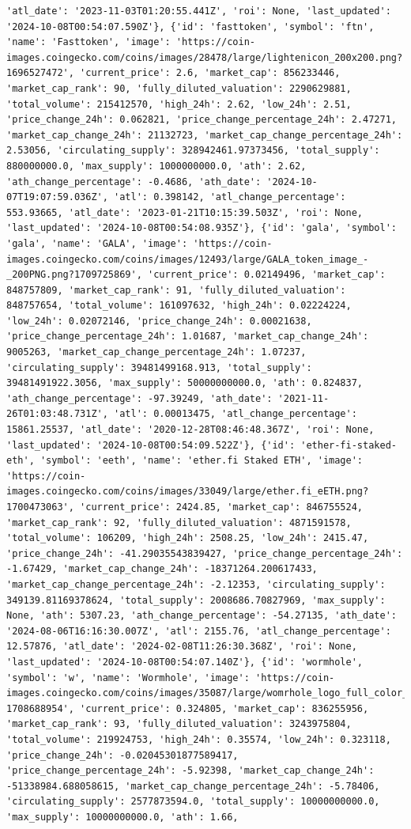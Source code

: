 \documentclass[
  letterpaper,
  DIV=11,
  numbers=noendperiod]{scrreprt}
\begin{document}
\begin{verbatim}
'atl_date': '2023-11-03T01:20:55.441Z', 'roi': None, 'last_updated': '2024-10-08T00:54:07.590Z'}, {'id': 'fasttoken', 'symbol': 'ftn', 'name': 'Fasttoken', 'image': 'https://coin-images.coingecko.com/coins/images/28478/large/lightenicon_200x200.png?1696527472', 'current_price': 2.6, 'market_cap': 856233446, 'market_cap_rank': 90, 'fully_diluted_valuation': 2290629881, 'total_volume': 215412570, 'high_24h': 2.62, 'low_24h': 2.51, 'price_change_24h': 0.062821, 'price_change_percentage_24h': 2.47271, 'market_cap_change_24h': 21132723, 'market_cap_change_percentage_24h': 2.53056, 'circulating_supply': 328942461.97373456, 'total_supply': 880000000.0, 'max_supply': 1000000000.0, 'ath': 2.62, 'ath_change_percentage': -0.4686, 'ath_date': '2024-10-07T19:07:59.036Z', 'atl': 0.398142, 'atl_change_percentage': 553.93665, 'atl_date': '2023-01-21T10:15:39.503Z', 'roi': None, 'last_updated': '2024-10-08T00:54:08.935Z'}, {'id': 'gala', 'symbol': 'gala', 'name': 'GALA', 'image': 'https://coin-images.coingecko.com/coins/images/12493/large/GALA_token_image_-_200PNG.png?1709725869', 'current_price': 0.02149496, 'market_cap': 848757809, 'market_cap_rank': 91, 'fully_diluted_valuation': 848757654, 'total_volume': 161097632, 'high_24h': 0.02224224, 'low_24h': 0.02072146, 'price_change_24h': 0.00021638, 'price_change_percentage_24h': 1.01687, 'market_cap_change_24h': 9005263, 'market_cap_change_percentage_24h': 1.07237, 'circulating_supply': 39481499168.913, 'total_supply': 39481491922.3056, 'max_supply': 50000000000.0, 'ath': 0.824837, 'ath_change_percentage': -97.39249, 'ath_date': '2021-11-26T01:03:48.731Z', 'atl': 0.00013475, 'atl_change_percentage': 15861.25537, 'atl_date': '2020-12-28T08:46:48.367Z', 'roi': None, 'last_updated': '2024-10-08T00:54:09.522Z'}, {'id': 'ether-fi-staked-eth', 'symbol': 'eeth', 'name': 'ether.fi Staked ETH', 'image': 'https://coin-images.coingecko.com/coins/images/33049/large/ether.fi_eETH.png?1700473063', 'current_price': 2424.85, 'market_cap': 846755524, 'market_cap_rank': 92, 'fully_diluted_valuation': 4871591578, 'total_volume': 106209, 'high_24h': 2508.25, 'low_24h': 2415.47, 'price_change_24h': -41.29035543839427, 'price_change_percentage_24h': -1.67429, 'market_cap_change_24h': -18371264.200617433, 'market_cap_change_percentage_24h': -2.12353, 'circulating_supply': 349139.81169378624, 'total_supply': 2008686.70827969, 'max_supply': None, 'ath': 5307.23, 'ath_change_percentage': -54.27135, 'ath_date': '2024-08-06T16:16:30.007Z', 'atl': 2155.76, 'atl_change_percentage': 12.57876, 'atl_date': '2024-02-08T11:26:30.368Z', 'roi': None, 'last_updated': '2024-10-08T00:54:07.140Z'}, {'id': 'wormhole', 'symbol': 'w', 'name': 'Wormhole', 'image': 'https://coin-images.coingecko.com/coins/images/35087/large/womrhole_logo_full_color_rgb_2000px_72ppi_fb766ac85a.png?1708688954', 'current_price': 0.324805, 'market_cap': 836255956, 'market_cap_rank': 93, 'fully_diluted_valuation': 3243975804, 'total_volume': 219924753, 'high_24h': 0.35574, 'low_24h': 0.323118, 'price_change_24h': -0.02045301877589417, 'price_change_percentage_24h': -5.92398, 'market_cap_change_24h': -51338984.688058615, 'market_cap_change_percentage_24h': -5.78406, 'circulating_supply': 2577873594.0, 'total_supply': 10000000000.0, 'max_supply': 10000000000.0, 'ath': 1.66, 
\end{verbatim}
\end{document}
